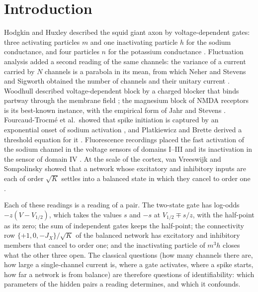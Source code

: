 \documentclass[11pt]{article}
\theoremstyle{definition}\newtheorem{definition}[theorem]{Definition}
\theoremstyle{remark}\newtheorem{remark}[theorem]{Remark}
\begin{document}
\section{Introduction}\label{sec:intro}
Hodgkin and Huxley described the squid giant axon by voltage-dependent gates: three activating particles $m$ and one inactivating particle $h$ for the sodium conductance, and four particles $n$ for the potassium conductance \cite{HH}. Fluctuation analysis added a second reading of the same channels: the variance of a current carried by $N$ channels is a parabola in its mean, from which Neher and Stevens and Sigworth obtained the number of channels and their unitary current \cite{NeherStevens,Sigworth,AGL}. Woodhull described voltage-dependent block by a charged blocker that binds partway through the membrane field \cite{Woodhull}; the magnesium block of NMDA receptors \cite{Nowak,Mayer} is its best-known instance, with the empirical form of Jahr and Stevens \cite{JahrStevens}. Fourcaud-Trocm\'e et al.\ showed that spike initiation is captured by an exponential onset of sodium activation \cite{FT}, and Platkiewicz and Brette derived a threshold equation for it \cite{PB}. Fluorescence recordings placed the fast activation of the sodium channel in the voltage sensors of domains I--III and its inactivation in the sensor of domain IV \cite{ChandaBezanilla,Capes}. At the scale of the cortex, van Vreeswijk and Sompolinsky showed that a network whose excitatory and inhibitory inputs are each of order $\sqrt K$ settles into a balanced state in which they cancel to order one \cite{vVS96,vVS98}.

Each of these readings is a reading of a pair. The two-state gate has log-odds $-z(V-V_{1/2})$, which takes the values $s$ and $-s$ at $V_{1/2}\mp s/z$, with the half-point as its zero; the sum of independent gates keeps the half-point; the connectivity row $\{+1,0,-J_X\}/\sqrt K$ of the balanced network has excitatory and inhibitory members that cancel to order one; and the inactivating particle of $m^3h$ closes what the other three open. The classical questions (how many channels there are, how large a single-channel current is, where a gate activates, where a spike starts, how far a network is from balance) are therefore questions of identifiability: which parameters of the hidden pairs a reading determines, and which it confounds.
\end{document}
